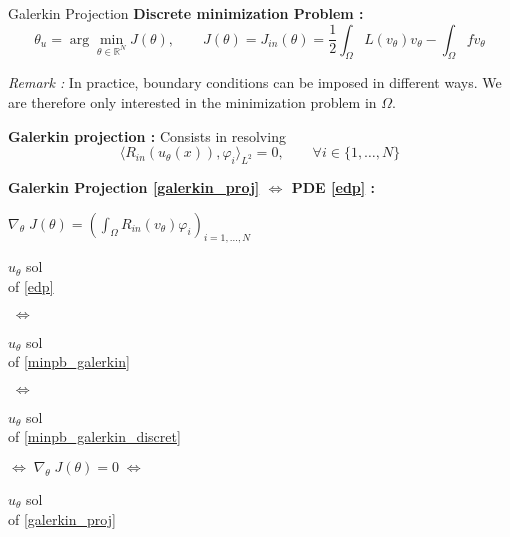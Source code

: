 \begin{frame}{Galerkin Projection}
	\textbf{Discrete minimization Problem :}
	\begin{equation}
		\theta_u=\arg\min_{\theta\in\mathbb{R}^N} J(\theta), \qquad J(\theta)=J_{in}(\theta)=\frac{1}{2}\int_\Omega L(v_\theta)v_\theta - \int_\Omega fv_\theta \label{minpb_galerkin_discret}
	\end{equation}
%		
	
	\footnotesize	
	\textit{Remark :} In practice, boundary conditions can be imposed in different ways. We are therefore only interested in the minimization problem in $\Omega$.
	
	\normalsize	
	
	\textbf{Galerkin projection :} Consists in resolving
	\begin{equation}
		\langle R_{in}(u_\theta(x)),\varphi_i\rangle_{L^2}=0, \qquad \forall i\in\{1,\dots,N\}\label{galerkin_proj}
	\end{equation}

	\footnotesize
	\begin{center}
		\begin{tcolorbox}[
			colback=white, %
			colframe=other, %
			arc=2mm, %
			boxrule=0.5pt, %
			breakable, enhanced jigsaw,
			width=\linewidth
			]
			
			\textbf{Galerkin Projection \eqref{galerkin_proj} $\Leftrightarrow$ PDE \eqref{edp} :}
			
			\centering
			$\nabla_\theta \; J(\theta)=\left(\int_\Omega R_{in}(v_\theta)\varphi_i\right)_{i=1,\dots,N} \qquad $  
			
			\vspace{5pt}
			
			\begin{minipage}{0.1\linewidth}
				\centering
				$u_\theta$ sol \\
				of \eqref{edp}
			\end{minipage} $\; \Leftrightarrow \;$	\begin{minipage}{0.1\linewidth}
				\centering
				$u_\theta$ sol \\
				of \eqref{minpb_galerkin}
			\end{minipage} $\; \Leftrightarrow \;$	\begin{minipage}{0.1\linewidth}
				\centering
				$u_\theta$ sol \\
				of \eqref{minpb_galerkin_discret}
			\end{minipage} $\Leftrightarrow \; \nabla_\theta \; J(\theta)=0 \; \Leftrightarrow$ \begin{minipage}{0.1\linewidth}
				\centering
				$u_\theta$ sol \\
				of \eqref{galerkin_proj}
			\end{minipage}
		

\end{tcolorbox}
\end{center}
\end{frame}
